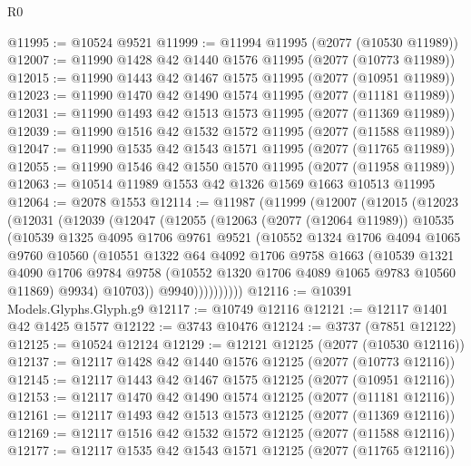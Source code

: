 \begin{lexlean}{R0}
\begin{coremodule}
@11995 := @10524 @9521
@11999 := @11994 @11995 (@2077 (@10530 @11989))
@12007 := @11990 @1428 @42 @1440 @1576 @11995 (@2077 (@10773 @11989))
@12015 := @11990 @1443 @42 @1467 @1575 @11995 (@2077 (@10951 @11989))
@12023 := @11990 @1470 @42 @1490 @1574 @11995 (@2077 (@11181 @11989))
@12031 := @11990 @1493 @42 @1513 @1573 @11995 (@2077 (@11369 @11989))
@12039 := @11990 @1516 @42 @1532 @1572 @11995 (@2077 (@11588 @11989))
@12047 := @11990 @1535 @42 @1543 @1571 @11995 (@2077 (@11765 @11989))
@12055 := @11990 @1546 @42 @1550 @1570 @11995 (@2077 (@11958 @11989))
@12063 := @10514 @11989 @1553 @42 @1326 @1569 @1663 @10513 @11995
@12064 := @2078 @1553
@12114 := @11987
    (@11999
      (@12007
        (@12015
          (@12023
            (@12031
              (@12039
                (@12047
                  (@12055
                    (@12063
                      (@2077 (@12064 @11989))
                      @10535
                      (@10539
                        @1325
                        @4095
                        @1706
                        @9761
                        @9521
                        (@10552
                          @1324
                          @1706
                          @4094
                          @1065
                          @9760
                          @10560
                          (@10551
                            @1322
                            @64
                            @4092
                            @1706
                            @9758
                            @1663
                            (@10539
                              @1321
                              @4090
                              @1706
                              @9784
                              @9758
                              (@10552 @1320 @1706 @4089 @1065 @9783 @10560 @11869)
                              @9934)
                            @10703))
                        @9940))))))))))
@12116 := @10391 Models.Glyphs.Glyph.g9
@12117 := @10749 @12116
@12121 := @12117 @1401 @42 @1425 @1577
@12122 := @3743 @10476
@12124 := @3737 (@7851 @12122)
@12125 := @10524 @12124
@12129 := @12121 @12125 (@2077 (@10530 @12116))
@12137 := @12117 @1428 @42 @1440 @1576 @12125 (@2077 (@10773 @12116))
@12145 := @12117 @1443 @42 @1467 @1575 @12125 (@2077 (@10951 @12116))
@12153 := @12117 @1470 @42 @1490 @1574 @12125 (@2077 (@11181 @12116))
@12161 := @12117 @1493 @42 @1513 @1573 @12125 (@2077 (@11369 @12116))
@12169 := @12117 @1516 @42 @1532 @1572 @12125 (@2077 (@11588 @12116))
@12177 := @12117 @1535 @42 @1543 @1571 @12125 (@2077 (@11765 @12116))

\end{coremodule}
\end{lexlean}
